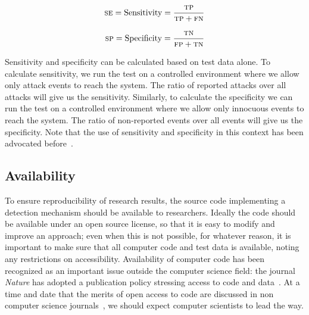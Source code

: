 \documentclass[10pt,journal,compsoc]{IEEEtran}
\begin{document}
\vspace{0.5mm}
\noindent\begin{minipage}{0.5\linewidth}
\begin{equation}
  \textsc{se} = \textrm{Sensitivity} = \frac{\textsc{tp}}{\textsc{tp}
    + \textsc{fn}}
\label{eq:sensitivity}
\end{equation}
\end{minipage}%
\begin{minipage}{0.5\linewidth}
\begin{equation}
  \textsc{sp} = \textrm{Specificity} = \frac{\textsc{tn}}{\textsc{fp}
    + \textsc{tn}}
\label{eq:specificity}
\end{equation}
\end{minipage}\par\vspace{\belowdisplayskip}

\noindent
Sensitivity and specificity can be calculated based on test
data alone. To calculate sensitivity, we run the test on a
controlled environment where we allow only attack events to reach the
system. The ratio of reported attacks over all attacks will give us
the sensitivity. Similarly, to calculate the specificity we can run
the test on a controlled environment where we allow only innocuous
events to reach the system. The ratio of non-reported events over all
events will give us the specificity.
Note that the use of sensitivity and specificity in this context
has been advocated before~\cite{PP12}.

\subsection{Availability}

To ensure reproducibility of research results, the source code
implementing a detection mechanism should be available to researchers.
Ideally the code should be available under an open source license, so
that it is easy to modify and improve an approach; even when this is
not possible, for whatever reason, it is important to make sure that
all computer code and test data is available, noting any restrictions
on accessibility. Availability of computer code has been recognized as
an important issue outside the computer science field: the journal
\emph{Nature} has adopted a publication policy stressing
access to code and data~\cite{nature2014}. At a time and date that the
merits of open access to code are discussed in non computer science
journals~\cite{easterbrook2014}, we should expect computer scientists
to lead the way.
 
\end{document}
